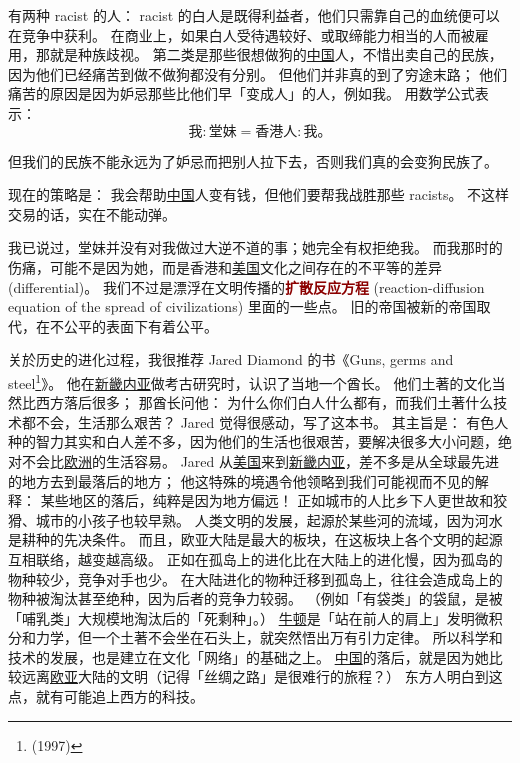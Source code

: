 \documentclass[12pt]{report}
\renewcommand{\em}[1]{\textbf{\textcolor{DarkRed}{#1}}}
\begin{document}
{有两种 racist 的人： racist 的白人是既得利益者，他们只需靠自己的血统便可以在竞争中获利。 在商业上，如果白人受待遇较好、或取缔能力相当的人而被雇用，那就是种族歧视。 第二类是那些很想做狗的\uline{中国}人，不惜出卖自己的民族，因为他们已经痛苦到做不做狗都没有分别。 但他们并非真的到了穷途末路； 他们痛苦的原因是因为妒忌那些比他们早「变成人」的人，例如我。 用数学公式表示：
$$ \mbox{我} : \mbox{堂妹} = \mbox{香港人} : \mbox{我。} $$

但我们的民族不能永远为了妒忌而把别人拉下去，否则我们真的会变狗民族了。

现在的策略是： 我会帮助\uline{中国}人变有钱，但他们要帮我战胜那些 racists。 不这样交易的话，实在不能动弹。

我已说过，堂妹并没有对我做过大逆不道的事；她完全有权拒绝我。 而我那时的伤痛，可能不是因为她，而是香港和\uline{美国}文化之间存在的不平等的差异 (differential)。 我们不过是漂浮在文明传播的\em{扩散反应方程} (reaction-diffusion equation of the spread of civilizations) 里面的一些点。 旧的帝国被新的帝国取代，在不公平的表面下有着公平。

关於历史的进化过程，我很推荐 Jared Diamond 的书《Guns, germs and steel\footnote{(1997)}》。  他在\uline{新畿内亚}做考古研究时，认识了当地一个酋长。  他们土著的文化当然比西方落后很多； 那酋长问他： 为什么你们白人什么都有，而我们土著什么技术都不会，生活那么艰苦？  Jared 觉得很感动，写了这本书。  其主旨是： 有色人种的智力其实和白人差不多，因为他们的生活也很艰苦，要解决很多大小问题，绝对不会比\uline{欧洲}的生活容易。  Jared 从\uline{美国}来到\uline{新畿内亚}，差不多是从全球最先进的地方去到最落后的地方； 他这特殊的境遇令他领略到我们可能视而不见的解释： 某些地区的落后，纯粹是因为地方偏远！  正如城市的人比乡下人更世故和狡猾、城市的小孩子也较早熟。  人类文明的发展，起源於某些河的流域，因为河水是耕种的先决条件。 而且，欧亚大陆是最大的板块，在这板块上各个文明的起源互相联络，越变越高级。 正如在孤岛上的进化比在大陆上的进化慢，因为孤岛的物种较少，竞争对手也少。 在大陆进化的物种迁移到孤岛上，往往会造成岛上的物种被淘汰甚至绝种，因为后者的竞争力较弱。 （例如「有袋类」的袋鼠，是被「哺乳类」大规模地淘汰后的「死剩种」。）  \uline{牛顿}是「站在前人的肩上」发明微积分和力学，但一个土著不会坐在石头上，就突然悟出万有引力定律。 所以科学和技术的发展，也是建立在文化「网络」的基础之上。 \uline{中国}的落后，就是因为她比较远离\uline{欧亚}大陆的文明（记得「丝绸之路」是很难行的旅程？） 东方人明白到这点，就有可能追上西方的科技。

}
\end{document}
